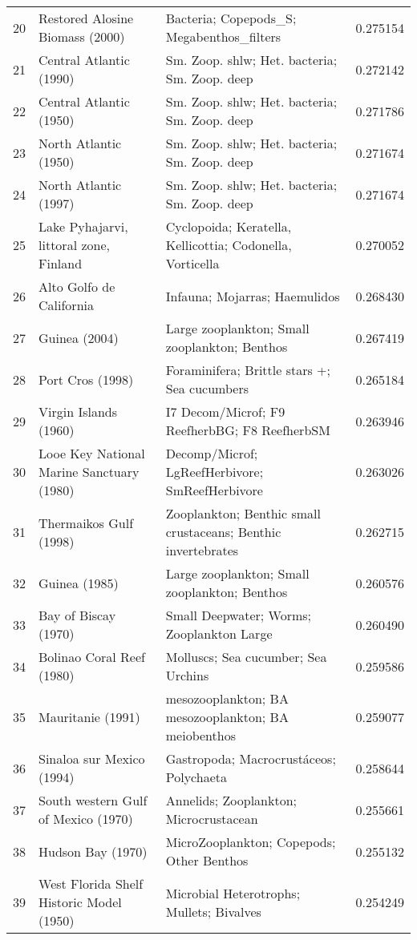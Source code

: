 \begin{tabular}{rllr}
20 & Restored Alosine Biomass (2000) & Bacteria; Copepods_S; Megabenthos_filters & 0.275154 \\
21 & Central Atlantic (1990) & Sm. Zoop. shlw; Het. bacteria; Sm. Zoop. deep & 0.272142 \\
22 & Central Atlantic (1950) & Sm. Zoop. shlw; Het. bacteria; Sm. Zoop. deep & 0.271786 \\
23 & North Atlantic (1950) & Sm. Zoop. shlw; Het. bacteria; Sm. Zoop. deep & 0.271674 \\
24 & North Atlantic (1997) & Sm. Zoop. shlw; Het. bacteria; Sm. Zoop. deep & 0.271674 \\
25 & Lake Pyhajarvi, littoral zone, Finland & Cyclopoida; Keratella, Kellicottia; Codonella, Vorticella & 0.270052 \\
26 & Alto Golfo de California & Infauna; Mojarras; Haemulidos & 0.268430 \\
27 & Guinea  (2004) & Large zooplankton; Small zooplankton; Benthos & 0.267419 \\
28 & Port Cros (1998) & Foraminifera; Brittle stars +; Sea cucumbers & 0.265184 \\
29 & Virgin Islands (1960) & I7 Decom/Microf; F9 ReefherbBG; F8 ReefherbSM & 0.263946 \\
30 & Looe Key National Marine Sanctuary (1980) & Decomp/Microf; LgReefHerbivore; SmReefHerbivore & 0.263026 \\
31 & Thermaikos Gulf (1998) & Zooplankton; Benthic small crustaceans; Benthic invertebrates & 0.262715 \\
32 & Guinea (1985) & Large zooplankton; Small zooplankton; Benthos & 0.260576 \\
33 & Bay of Biscay (1970) & Small Deepwater; Worms; Zooplankton Large & 0.260490 \\
34 & Bolinao Coral Reef (1980) & Molluscs; Sea cucumber; Sea Urchins & 0.259586 \\
35 & Mauritanie (1991) & mesozooplankton; BA mesozooplankton; BA meiobenthos & 0.259077 \\
36 & Sinaloa sur Mexico (1994) & Gastropoda; Macrocrustáceos; Polychaeta & 0.258644 \\
37 & South western Gulf of Mexico (1970) & Annelids; Zooplankton; Microcrustacean & 0.255661 \\
38 & Hudson Bay (1970) & MicroZooplankton; Copepods; Other Benthos & 0.255132 \\
39 & West Florida Shelf Historic Model (1950) & Microbial Heterotrophs; Mullets; Bivalves & 0.254249 \\

\end{tabular}
